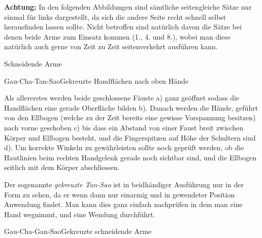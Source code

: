
\textbf{Achtung: } In den folgenden Abbildungen sind s\"amtliche seitengleiche S\"atze nur einmal f\"ur links dargestellt, da sich die andere Seite recht schnell selbst herausfinden lassen sollte. Nicht betroffen sind nat\"urlich davon die S\"atze bei denen beide Arme zum Einsatz kommen (1., 4. und 8.), wobei man diese nat\"urlich auch gerne von Zeit zu Zeit seitenverkehrt ausf\"uhren kann.


\begin{WTSatz}{Schneidende Arme}%


	\begin{WTSatzTeil}{Gau-Cha-Tan-Sao}{Gekreuzte Handfl\"achen nach oben H\"ande}
		
		Als allererstes werden beide geschlossene F\"auste a) ganz ge\"offnet sodass die Handfl\"achen eine gerade Oberfl\"ache bilden b). Danach werden die H\"ande, gef\"uhrt von den Ellbogen (welche zu der Zeit bereits eine gewisse Vorspannung besitzen) nach vorne geschoben c) bis dass ein Abstand von einer Faust breit zwischen K\"orper und Ellbogen besteht, und die Fingerspitzen auf H\"ohe der Schultern sind d). Um korrekte Winkeln zu gew\"ahrleisten sollte noch gepr\"uft werden, ob die Hautlinien beim rechten Handgelenk gerade noch sichtbar sind, und die Ellbogen seitlich mit dem K\"orper abschliessen.
		
		Der sogenannte \textit{gekreuzte Tan-Sao} ist in beidh\"andiger Ausf\"uhrung nur in der Form zu sehen, da er wenn dann nur einarmig und in gewendeter Position Anwendung findet. Man kann dies ganz einfach nachpr\"ufen in dem man eine Hand wegnimmt, und eine Wendung durchf\"uhrt.
		
	\end{WTSatzTeil}
	
	\begin{WTSatzTeil}{Gau-Cha-Gan-Sao}{Gekreuzte schneidende Arme}
		

\end{WTSatzTeil}
\end{WTSatz}
